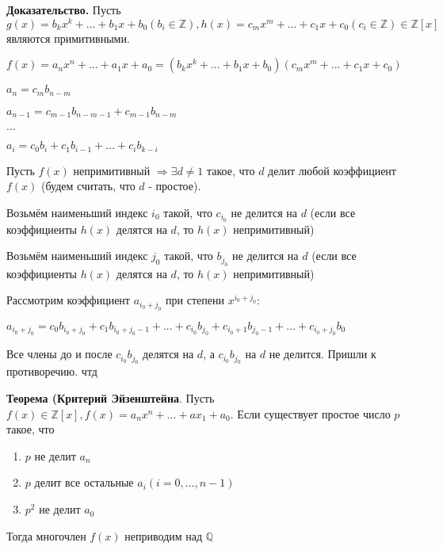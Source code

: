 \documentclass[a4paper]{article}
\begin{document}
\begin{hproof}\textbf{Доказательство.}
Пусть $g(x) = b_kx^k + ... + b_1x+b_0 (b_i \in \mathbb{Z}), h(x) = c_mx^m + ... + c_1x + c_0 (c_i \in \mathbb{Z}) \in \mathbb{Z}[x]$ являются примитивными.

$f(x) = a_nx^n + ... + a_1x + a_0 = (b_kx^k + ... + b_1x+b_0)(c_mx^m + ... + c_1x + c_0)$

$a_n = c_mb_{n-m}$

$a_{n-1} = c_{m-1}b_{n-m-1} + c_{m-1}b_{n-m}$

$...$

$a_i = c_0b_i + c_1b_{i-1} + ... + c_ib_{k-i}$

Пусть $f(x)$ непримитивный $\Rightarrow \exists d \neq 1$  такое, что $d$ делит любой коэффициент $f(x)$ (будем считать, что $d$ - простое).

Возьмём наименьший индекс $i_0$ такой, что $c_{i_0}$ не делится на $d$ (если все коэффициенты $h(x)$ делятся на $d$, то $h(x)$ непримитивный)

Возьмём наименьший индекс $j_0$ такой, что $b_{j_0}$ не делится на $d$ (если все коэффициенты $h(x)$ делятся на $d$, то $h(x)$ непримитивный)


Рассмотрим коэффициент $a_{i_0 + j_0}$ при степени $x^{i_0+j_0}$:

$a_{i_0+j_0} = c_0b_{i_0+j_0} + c_1b_{i_0+j_0-1} + ... + c_{i_0}b_{j_0} + c_{i_0+1}b_{j_0-1} + ... + c_{i_0+j_0}b_0$

Все члены до и после $c_{i_0}b_{j_0}$ делятся на $d$, а $c_{i_0}b_{j_0}$ на $d$ не делится. Пришли к противоречию. чтд
\end{hproof}

\begin{htheorem}\textbf{Теорема (Критерий Эйзенштейна}.
Пусть $f(x) \in \mathbb{Z}[x], f(x) = a_nx^n + ... + ax_1 + a_0$. Если существует простое число $p$ такое, что \begin{enumerate}
\item $p$ не делит $a_n$
\item $p$ делит все остальные $a_i (i =0, ..., n-1)$
\item $p^2$ не делит $a_0$
\end{enumerate}

Тогда многочлен $f(x)$ неприводим над $\mathbb{Q}$
\end{htheorem}
\end{document}
